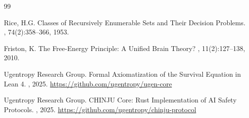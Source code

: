 \documentclass[11pt,a4paper]{article}
\begin{document}

\begin{thebibliography}{99}

Rice, H.G.
\newblock Classes of Recursively Enumerable Sets and Their Decision Problems.
, 74(2):358--366, 1953.

Friston, K.
\newblock The Free-Energy Principle: A Unified Brain Theory?
, 11(2):127--138, 2010.

Ugentropy Research Group.
\newblock Formal Axiomatization of the Survival Equation in Lean 4.
, 2025.
\newblock \url{https://github.com/ugentropy/ugen-core}

Ugentropy Research Group.
\newblock CHINJU Core: Rust Implementation of AI Safety Protocols.
, 2025.
\newblock \url{https://github.com/ugentropy/chinju-protocol}

\end{thebibliography}
\end{document}
